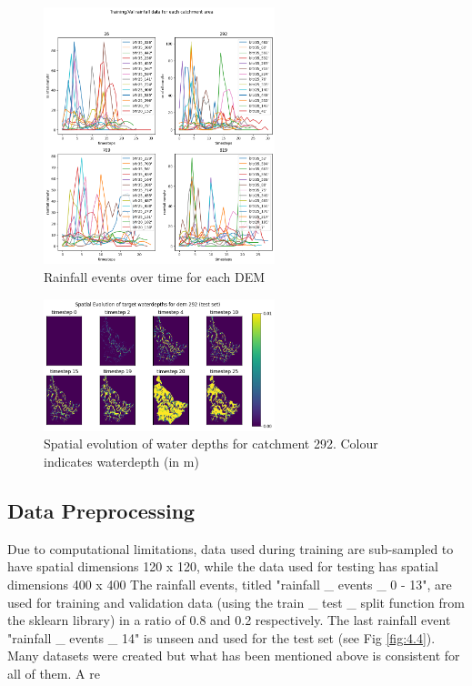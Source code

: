 \begin{figure}[htbp]
	\includegraphics[width=0.6\textwidth]{../Figures/rainfall_train.png}
	\centering
	\caption[rainfall events]{Rainfall events over time for each DEM} 
	\label{fig:4.2}
\end{figure}

\begin{figure}[htbp]
	\includegraphics[width=0.6\textwidth]{../Figures/spatial_evoltution_waterdepth.png}
	\centering
	\caption[wd spatial evolution]{Spatial evolution of water depths for catchment 292. Colour indicates waterdepth (in m)} 
	\label{fig:4.3}
\end{figure}


\subsection{Data Preprocessing}
Due to computational limitations, data used during training are sub-sampled to have spatial dimensions 120 x 120, while the data used for testing has spatial dimensions 400 x 400 The rainfall events, titled "rainfall \_ events \_ 0 - 13", are used for training and validation data (using the train \_ test \_ split function from the sklearn library) in a ratio of 0.8 and 0.2 respectively. The last  rainfall  event "rainfall \_ events \_ 14" is unseen and used for the test set (see Fig \ref{fig:4.4}). \\
Many datasets were created but what has been mentioned above is consistent for all of them. A re

